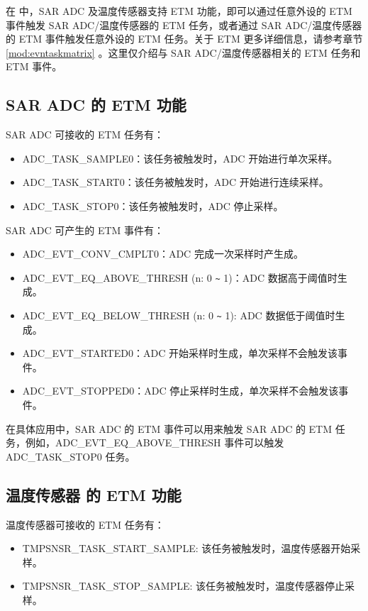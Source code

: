 \documentclass[main\_\_CN.tex]{subfiles}
\begin{document}
在 \chipname{} 中，SAR ADC 及温度传感器支持 ETM 功能，即可以通过任意外设的 ETM 事件触发 SAR ADC/温度传感器的 ETM 任务，或者通过 SAR ADC/温度传感器的 ETM 事件触发任意外设的 ETM 任务。关于 ETM 更多详细信息，请参考章节 \ref{mod:evntaskmatrix} 。这里仅介绍与 SAR ADC/温度传感器相关的 ETM 任务和 ETM 事件。

\subsection{SAR ADC 的 ETM 功能}

SAR ADC 可接收的 ETM 任务有：

\begin{itemize}
    \item ADC\_TASK\_SAMPLE0：该任务被触发时，ADC 开始进行单次采样。
    \item ADC\_TASK\_START0：该任务被触发时，ADC 开始进行连续采样。
    \item ADC\_TASK\_STOP0：该任务被触发时，ADC 停止采样。
\end{itemize}

SAR ADC 可产生的 ETM 事件有：

\begin{itemize}
    \item ADC\_EVT\_CONV\_CMPLT0：ADC 完成一次采样时产生成。
    \item ADC\_EVT\_EQ\_ABOVE\_THRESH (n: 0 \verb+~+ 1)：ADC 数据高于阈值时生成。
    \item ADC\_EVT\_EQ\_BELOW\_THRESH (n: 0 \verb+~+ 1): ADC 数据低于阈值时生成。
    \item ADC\_EVT\_STARTED0：ADC 开始采样时生成，单次采样不会触发该事件。
    \item ADC\_EVT\_STOPPED0：ADC 停止采样时生成，单次采样不会触发该事件。
\end{itemize}

在具体应用中，SAR ADC 的 ETM 事件可以用来触发 SAR ADC 的 ETM 任务，例如，ADC\_EVT\_EQ\_ABOVE\_THRESH 事件可以触发 ADC\_TASK\_STOP0 任务。

\subsection{温度传感器 的 ETM 功能}

温度传感器可接收的 ETM 任务有：

\begin{itemize}
    \item TMPSNSR\_TASK\_START\_SAMPLE: 该任务被触发时，温度传感器开始采样。
    \item TMPSNSR\_TASK\_STOP\_SAMPLE: 该任务被触发时，温度传感器停止采样。
\end{itemize}
\end{document}
